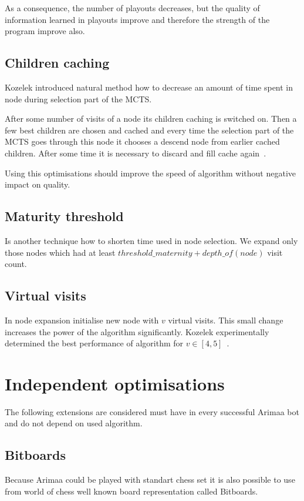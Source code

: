 As a consequence, the number of playouts decreases, but the quality of
information learned in playouts improve and therefore the strength of the
program improve also.

\subsection{Children caching}
Kozelek introduced natural method how to decrease an amount of time spent in
node during selection part of the MCTS.

After some number of visits of a node its children caching is switched on. Then
a few best children are chosen and cached and every time the selection part of
the MCTS goes through this node it chooses a descend node from earlier cached
children. After some time it is necessary to discard and fill cache
again~\cite{KOZELEK}.

Using this optimisations should improve the speed of algorithm without negative
impact on quality.

\subsection{Maturity threshold}
Is another technique how to shorten time used in node selection. We
expand only those nodes which had at least $threshold\_maternity +
depth\_of(node)$ visit count.

\subsection{Virtual visits}
In node expansion initialise new node with $v$ virtual visits. This small
change increases the power of the algorithm significantly. Kozelek
experimentally determined the best performance of algorithm for $v \in
[4,5]$~\cite{KOZELEK}.

\section{Independent optimisations}
The following extensions are considered must have in every successful Arimaa
bot and do not depend on used algorithm.

	\subsection{Bitboards}
	Because Arimaa could be played with standart chess set it is also possible
	to use from world of chess well known board representation called
	Bitboards.

